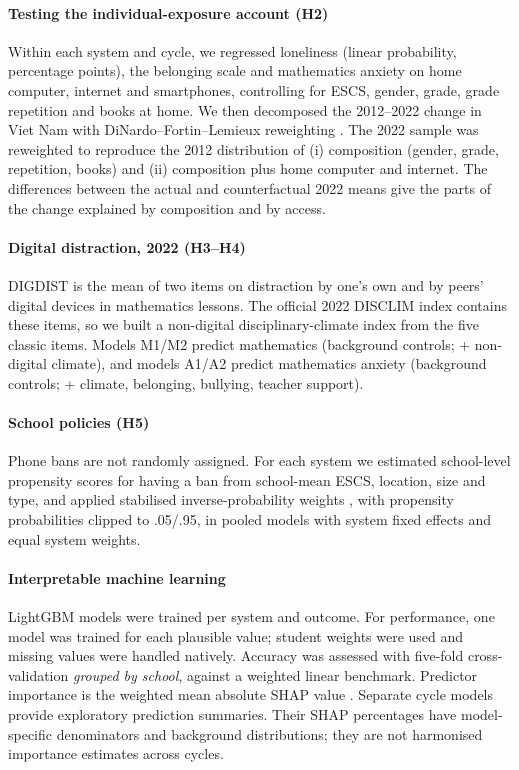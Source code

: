 \documentclass[preprint,12pt,authoryear,nonatbib]{elsarticle}
\let\citep\parencite
\begin{document}
\paragraph{Testing the individual-exposure account (H2)} Within each system and cycle, we regressed loneliness (linear probability, percentage points), the belonging scale and mathematics anxiety on home computer, internet and smartphones, controlling for ESCS, gender, grade, grade repetition and books at home. We then decomposed the 2012--2022 change in Viet Nam with DiNardo--Fortin--Lemieux reweighting \citep{dinardo1996}. The 2022 sample was reweighted to reproduce the 2012 distribution of (i) composition (gender, grade, repetition, books) and (ii) composition plus home computer and internet. The differences between the actual and counterfactual 2022 means give the parts of the change explained by composition and by access.

\paragraph{Digital distraction, 2022 (H3--H4)} DIGDIST is the mean of two items on distraction by one's own and by peers' digital devices in mathematics lessons. The official 2022 DISCLIM index contains these items, so we built a non-digital disciplinary-climate index from the five classic items. Models M1/M2 predict mathematics (background controls; + non-digital climate), and models A1/A2 predict mathematics anxiety (background controls; + climate, belonging, bullying, teacher support).

\paragraph{School policies (H5)} Phone bans are not randomly assigned. For each system we estimated school-level propensity scores for having a ban from school-mean ESCS, location, size and type, and applied stabilised inverse-probability weights \citep{rosenbaum1983}, with propensity probabilities clipped to .05/.95, in pooled models with system fixed effects and equal system weights.

\paragraph{Interpretable machine learning} LightGBM models \citep{ke2017} were trained per system and outcome. For performance, one model was trained for each plausible value; student weights were used and missing values were handled natively. Accuracy was assessed with five-fold cross-validation \emph{grouped by school}, against a weighted linear benchmark. Predictor importance is the weighted mean absolute SHAP value \citep{lundberg2017}. Separate cycle models provide exploratory prediction summaries. Their SHAP percentages have model-specific denominators and background distributions; they are not harmonised importance estimates across cycles.
\end{document}
